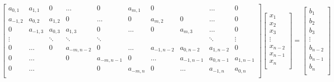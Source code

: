 \documentclass[final,5p]{elsarticle}
\numberwithin{equation}{section}
\begin{document}
    \begin{figure*}
        \begin{equation}
            \begin{bmatrix}
                a_{0,1}    & a_{1,1}    & 0       & \ldots  & 0      & a_{m,1}   & 0       &         & \ldots    &  0      \\
                a_{-1,2}   & a_{0,2}    & a_{1,2} & 0       & \ldots & 0         & a_{m,2} & 0       & \ldots    &  0      \\
                0          & a_{-1,3}   & a_{0,3} & a_{1,3} & 0      & \ldots    & 0       & a_{m,3} & \ldots    & 0       \\
                \vdots     &            & \ddots  & \ddots  & \ddots &           &         &         & \ddots    & \vdots  \\
                0          & \ldots     & 0      & a_{-m,n-2}  & 0       & \ldots  & a_{-1,n-2}  & a_{0,n-2} & a_{1,n-2} & 0 \\
                0          & \ldots     &         & 0      & a_{-m,n-1}  & 0       & \ldots  & a_{-1,n-1}  & a_{0,n-1} & a_{1,n-1} \\
                0          & \ldots     &         &         & 0      & a_{-m,n}  & 0       & \ldots  & a_{-1,n}  & a_{0,n} \\
            \end{bmatrix}
            \begin{bmatrix}
                x_1 \\
                x_2 \\
                x_3 \\
                \vdots \\
                x_{n-2} \\
                x_{n-1} \\
                x_{n} \\
            \end{bmatrix}
            =
            \begin{bmatrix}
                b_1 \\
                b_2 \\
                b_3 \\
                \vdots \\
                b_{n-2} \\
                b_{n-1} \\
                b_{n} \\
            \end{bmatrix}
            \label{eq:sistema}
        \end{equation}
    \end{figure*}
\end{document}
